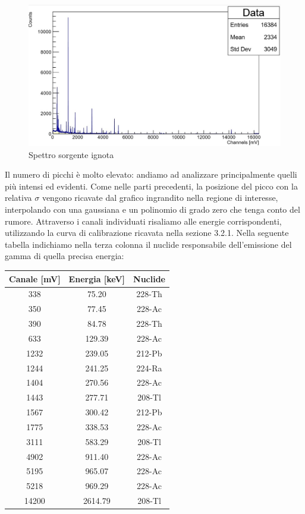 \documentclass[a4paper,10pt]{article}
\begin{document}
\begin{figure}[H]
    \centering
    \includegraphics[scale=0.6]{grafici/sorgenteignota}
    \caption{Spettro sorgente ignota}
\end{figure}

\noindent Il numero di picchi \`e molto elevato: andiamo ad analizzare principalmente quelli pi\`u intensi ed evidenti. Come nelle parti precedenti, la posizione del picco con la relativa $\sigma$ vengono ricavate dal grafico ingrandito nella regione di interesse, interpolando con una gaussiana e un polinomio di grado zero che tenga conto del rumore. Attraverso i canali individuati risaliamo alle energie corrispondenti, utilizzando la curva di calibrazione ricavata nella sezione 3.2.1. Nella seguente tabella indichiamo nella terza colonna il nuclide responsabile dell'emissione del gamma di quella precisa energia:

\begin{center}
    \begin{tabular}{ccc}
        \toprule
        Canale [mV] & Energia [keV] & Nuclide\\
        \midrule
	  338 & 75.20 & 228-Th\\
	  350 & 77.45 & 228-Ac\\
	  390 & 84.78 & 228-Th\\
	  633 & 129.39 & 228-Ac\\
	  1232 & 239.05 & 212-Pb\\
	  1244 & 241.25 & 224-Ra\\
	  1404 & 270.56 & 228-Ac\\
	  1443 & 277.71 & 208-Tl\\
	  1567 & 300.42 & 212-Pb\\
	  1775 & 338.53 & 228-Ac\\
	  3111 & 583.29 & 208-Tl\\
	  4902 & 911.40 & 228-Ac\\
	  5195 & 965.07 & 228-Ac\\
	  5218 & 969.29 & 228-Ac\\
	  14200 & 2614.79 & 208-Tl\\
        \bottomrule
    \end{tabular}\\
\end{center}
\end{document}
